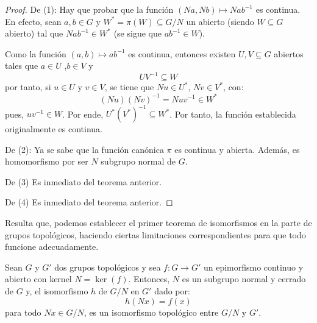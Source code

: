 \documentclass[12pt]{report}
\theoremstyle{largebreak}
\newcommand{\cf}[3]{\ensuremath{#1:#2\rightarrow#3}}
\begin{document}
    \begin{proof}
        De (1): Hay que probar que la función $(Na,Nb)\mapsto Nab^{-1}$ es continua. En efecto, sean $a,b\in G$ y $W^*=\pi(W)\subseteq G/N$ un abierto (siendo $W\subseteq G$ abierto) tal que $Nab^{-1}\in W^*$ (se sigue que $ab^{-1}\in W$).

        Como la función $(a,b)\mapsto ab^{-1}$ es continua, entonces existen $U,V\subseteq G$ abiertos tales que $a\in U$ ,$b\in V$ y
        \begin{equation*}
            UV^{-1}\subseteq W
        \end{equation*}
        por tanto, si $u\in U$ y $v\in V$, se tiene que $Nu\in U^*$, $Nv\in V^*$, con:
        \begin{equation*}
            (Nu)(Nv)^{-1}=Nuv^{-1}\in W^*
        \end{equation*}
        pues, $uv^{-1}\in W$. Por ende, $U^*(V^*)^{-1}\subseteq W^*$. Por tanto, la función establecida originalmente es continua.
        
        De (2): Ya se sabe que la función canónica $\pi$ es continua y abierta. Además, es homomorfismo por ser $N$ subgrupo normal de $G$.

        De (3) Es inmediato del teorema anterior.

        De (4) Es inmediato del teorema anterior.
    \end{proof}

    Resulta que, podemos establecer el primer teorema de isomorfismos en la parte de grupos topológicos, haciendo ciertas limitaciones correspondientes para que todo funcione adecuadamente.

    \begin{theor}
        Sean $G$ y $G'$ dos grupos topológicos y sea $\cf{f}{G}{G'}$ un epimorfismo continuo y abierto con kernel $N=\ker(f)$. Entonces, $N$ es un subgrupo normal y cerrado de $G$ y, el isomorfismo $h$ de $G/N$ en $G'$ dado por:
        \begin{equation*}
            h(Nx)=f(x)
        \end{equation*}
        para todo $Nx\in G/N$, es un isomorfismo topológico entre $G/N$ y $G'$.
    \end{theor}
\end{document}
